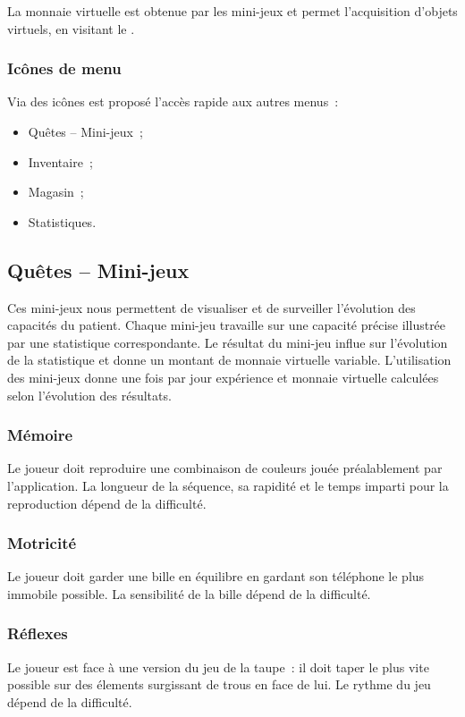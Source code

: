 \documentclass[a4paper,12pt,francais]{article}
\begin{document}
La monnaie virtuelle est obtenue par les mini-jeux et permet l’acquisition d’objets virtuels, en visitant le .

\subsubsection{Icônes de menu}

Via des icônes est proposé l’accès rapide aux autres menus~:

\begin{itemize}
    \item Quêtes – Mini-jeux~;
    \item Inventaire~;
    \item Magasin~;
    \item Statistiques.
\end{itemize}

\subsection{Quêtes – Mini-jeux}

Ces mini-jeux nous permettent de visualiser et de surveiller l'évolution des capacités du patient. Chaque mini-jeu travaille sur une capacité précise illustrée par une statistique correspondante. Le résultat du mini-jeu influe sur l'évolution de la statistique et donne un montant de monnaie virtuelle variable.
L'utilisation des mini-jeux donne une fois par jour expérience et monnaie virtuelle calculées selon l'évolution des résultats.

\subsubsection{Mémoire}
Le joueur doit reproduire une combinaison de couleurs jouée préalablement par l'application. La longueur de la séquence, sa rapidité et le temps imparti pour la reproduction dépend de la difficulté.

\subsubsection{Motricité}
Le joueur doit garder une bille en équilibre en gardant son téléphone le plus immobile possible. La sensibilité de la bille dépend de la difficulté.

\subsubsection{Réflexes}
Le joueur est face à une version du jeu de la taupe~: il doit taper le plus vite possible sur des élements surgissant de trous en face de lui. Le rythme du jeu dépend de la difficulté.
\end{document}
